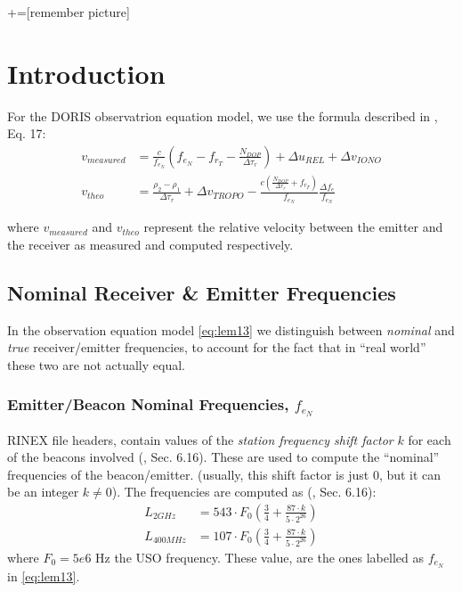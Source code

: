 +=[remember picture]
\everymath{\displaystyle}

\section{Introduction}
\label{sec:doris-introduction}

For the DORIS observatrion equation model, we use the formula described in 
\cite{lemoine-2016}, Eq. 17:
\begin{subequations} \label{eq:lem13}
    \begin{align}
        v_{measured} & = \frac{c}{f_{e_N}} (f_{e_N} - f_{r_T} -
          \frac{N_{DOP}}{\Delta\tau_r}) + \Delta u_{REL} + 
          \Delta v_{IONO} \label{eq:lem13a} \\
        v_{theo} &= \frac{\rho_2 - \rho_1}{\Delta\tau_r} +
          \Delta v_{TROPO} - \frac{c(\frac{N_{DOP}}{\Delta\tau_r} + 
          f_{r_T})}{f_{e_N}} \frac{\Delta f_e}{f_{e_N}} \label{eq:lem13b}
    \end{align}
\end{subequations}

where $v_{measured}$ and $v_{theo}$ represent the relative velocity between  
the emitter and the receiver as measured and computed respectively.

\subsection{Nominal Receiver \& Emitter Frequencies}
\label{ssec:nominal-frequencies}
In the observation equation model \ref{eq:lem13} we distinguish between 
\emph{nominal} and \emph{true} receiver/emitter frequencies, to account for 
the fact that in ``real world'' these two are not actually equal.

\subsubsection{Emitter/Beacon Nominal Frequencies, $f_{e_N}$}
\label{sssec:beacon-nominal-frequencies}

RINEX file headers, contain values of the \emph{station frequency shift 
factor} $k$ for each of the beacons involved (\cite{DORISRNX3}, Sec. 6.16). 
These are used to compute the ``nominal'' frequencies of the beacon/emitter. 
(usually, this shift factor is just $0$, but it can be an integer 
$k \neq 0$). The frequencies are computed as (\cite{DORISRNX3}, Sec. 6.16):
\begin{equation}
  \begin{aligned}
    L_{2GHz}   &= 543 \cdot F_0 \left( \frac{3}{4} + \frac{87\cdot k}{5 \cdot 2^{26}} \right) \\
    L_{400MHz} &= 107 \cdot F_0 \left( \frac{3}{4} + \frac{87\cdot k}{5 \cdot 2^{26}} \right) 
    \label{eq:nominal-freq}
  \end{aligned}
\end{equation}
where $F_0 = 5e6 \text{ Hz}$ the USO frequency. These value, are the ones 
labelled as $f_{e_N}$ in \ref{eq:lem13}.

